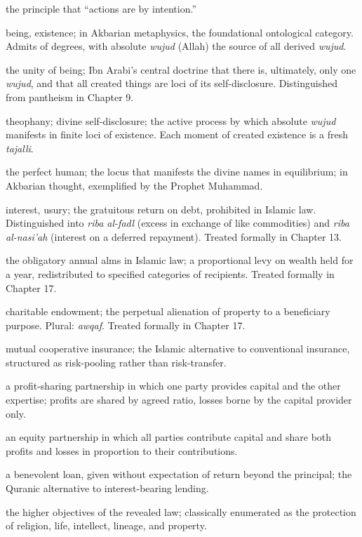 \begin{notationbox}
\begin{description}[leftmargin=4cm,style=nextline]
        the principle that ``actions are by intention.''
    \item[\textbf{wujud}] being, existence; in Akbarian metaphysics,
        the foundational ontological category. Admits of degrees,
        with absolute \textit{wujud} (Allah) the source of all
        derived \textit{wujud}.
    \item[\textbf{wahdat al-wujud}] the unity of being; Ibn Arabi's
        central doctrine that there is, ultimately, only one
        \textit{wujud}, and that all created things are loci of its
        self-disclosure. Distinguished from pantheism in Chapter 9.
    \item[\textbf{tajalli}] theophany; divine self-disclosure; the
        active process by which absolute \textit{wujud} manifests in
        finite loci of existence. Each moment of created existence is
        a fresh \textit{tajalli}.
    \item[\textbf{insan al-kamil}] the perfect human; the locus that
        manifests the divine names in equilibrium; in Akbarian
        thought, exemplified by the Prophet Muhammad.
    \item[\textbf{riba}] interest, usury; the gratuitous return on
        debt, prohibited in Islamic law. Distinguished into
        \textit{riba al-fadl} (excess in exchange of like commodities)
        and \textit{riba al-nasi'ah} (interest on a deferred
        repayment). Treated formally in Chapter 13.
    \item[\textbf{zakat}] the obligatory annual alms in Islamic law;
        a proportional levy on wealth held for a year, redistributed
        to specified categories of recipients. Treated formally in
        Chapter 17.
    \item[\textbf{waqf}] charitable endowment; the perpetual
        alienation of property to a beneficiary purpose. Plural:
        \textit{awqaf}. Treated formally in Chapter 17.
    \item[\textbf{takaful}] mutual cooperative insurance; the
        Islamic alternative to conventional insurance, structured as
        risk-pooling rather than risk-transfer.
    \item[\textbf{mudarabah}] a profit-sharing partnership in which
        one party provides capital and the other expertise; profits
        are shared by agreed ratio, losses borne by the capital
        provider only.
    \item[\textbf{musharakah}] an equity partnership in which all
        parties contribute capital and share both profits and losses
        in proportion to their contributions.
    \item[\textbf{qard hasan}] a benevolent loan, given without
        expectation of return beyond the principal; the Quranic
        alternative to interest-bearing lending.
    \item[\textbf{maqasid al-shari`ah}] the higher objectives of the
        revealed law; classically enumerated as the protection of
        religion, life, intellect, lineage, and property.
\end{description}
\end{notationbox}

